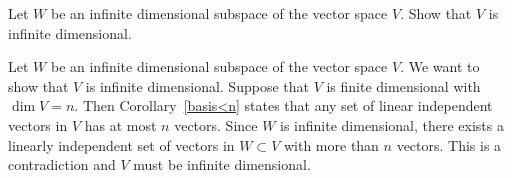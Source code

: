 \documentclass{ximera}
\begin{document}
\begin{exercise}  \label{c5.6.3A}
Let $W$ be an infinite dimensional subspace of the vector space $V$.
Show that $V$ is infinite dimensional.

\begin{solution}
Let $W$ be an infinite dimensional subspace of the vector 
space $V$.  We want to show that $V$ is infinite dimensional.  Suppose that
$V$ is finite dimensional with $\dim V=n$.  Then Corollary~\ref{basis<n}
states that any set of linear independent 
vectors in $V$ has at most $n$ vectors.  Since $W$ is infinite dimensional, 
there exists a linearly independent set of vectors in $W\subset V$ with more 
than $n$ vectors.  This is a contradiction and $V$ must be infinite 
dimensional.

\end{solution}
\end{exercise}
\end{document}
